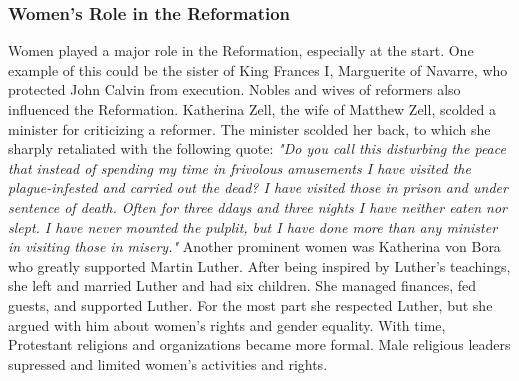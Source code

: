 \documentclass[11pt]{article}
\begin{document}
\subsubsection{Women's Role in the Reformation}
\label{sec:org4a36b24}
Women played a major role in the Reformation, especially at the start. One example of this could be the sister of King Frances I, Marguerite of Navarre, who protected John Calvin from execution. Nobles and wives of reformers also influenced the Reformation. Katherina Zell, the wife of Matthew Zell, scolded a minister for criticizing a reformer. The minister scolded her back, to which she sharply retaliated with the following quote: \emph{"Do you call this disturbing the peace that instead of spending my time in frivolous amusements I have visited the plague-infested and carried out the dead? I have visited those in prison and under sentence of death. Often for three ddays and three nights I have neither eaten nor slept. I have never mounted the pulplit, but I have done more than any minister in visiting those in misery."} Another prominent women was Katherina von Bora who greatly supported Martin Luther. After being inspired by Luther's teachings, she left and married Luther and had six children. She managed finances, fed guests, and supported Luther. For the most part she respected Luther, but she argued with him about women's rights and gender equality. With time, Protestant religions and organizations became more formal. Male religious leaders supressed and limited women's activities and rights.
\end{document}
